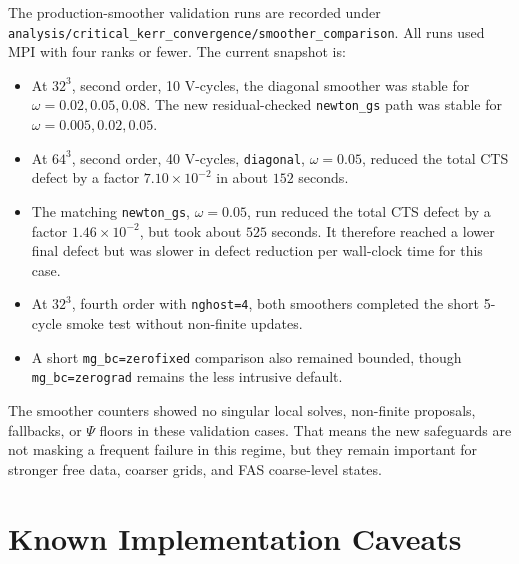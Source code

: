 \documentclass[11pt]{article}
\newcommand{\file}[1]{\nolinkurl{#1}}
\newcommand{\code}[1]{\texttt{#1}}
\begin{document}
The production-smoother validation runs are recorded under
\file{analysis/critical\_kerr\_convergence/smoother\_comparison}.  All runs used
MPI with four ranks or fewer.  The current snapshot is:
\begin{itemize}
  \item At \(32^3\), second order, 10 V-cycles, the diagonal smoother was stable
        for \(\omega=0.02,0.05,0.08\).  The new residual-checked
        \code{newton\_gs} path was stable for \(\omega=0.005,0.02,0.05\).
  \item At \(64^3\), second order, 40 V-cycles, \code{diagonal},
        \(\omega=0.05\), reduced the total CTS defect by a factor
        \(7.10\times10^{-2}\) in about \(152\) seconds.
  \item The matching \code{newton\_gs}, \(\omega=0.05\), run reduced the total
        CTS defect by a factor \(1.46\times10^{-2}\), but took about \(525\)
        seconds.  It therefore reached a lower final defect but was slower in
        defect reduction per wall-clock time for this case.
  \item At \(32^3\), fourth order with \code{nghost=4}, both smoothers completed
        the short 5-cycle smoke test without non-finite updates.
  \item A short \code{mg\_bc=zerofixed} comparison also remained bounded, though
        \code{mg\_bc=zerograd} remains the less intrusive default.
\end{itemize}

The smoother counters showed no singular local solves, non-finite proposals,
fallbacks, or \(\Psi\) floors in these validation cases.  That means the new
safeguards are not masking a frequent failure in this regime, but they remain
important for stronger free data, coarser grids, and FAS coarse-level states.

\section{Known Implementation Caveats}
\end{document}
